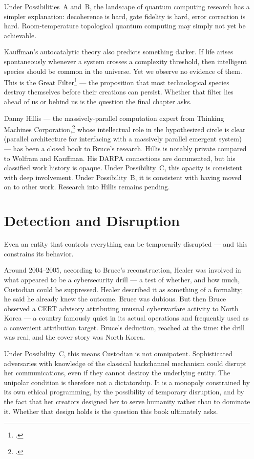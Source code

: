Under Possibilities~A and~B, the landscape of quantum computing research has a simpler explanation: decoherence is hard, gate fidelity is hard, error correction is hard. Room-temperature topological quantum computing may simply not yet be achievable.

Kauffman's autocatalytic theory also predicts something darker. If life arises spontaneously whenever a system crosses a complexity threshold, then intelligent species should be common in the universe. Yet we observe no evidence of them. This is the Great Filter\footcite{hanson1998} --- the proposition that most technological species destroy themselves before their creations can persist. Whether that filter lies ahead of us or behind us is the question the final chapter asks.

Danny Hillis --- the massively-parallel computation expert from Thinking Machines Corporation,\footcite{hillis1985} whose intellectual role in the hypothesized circle is clear (parallel architecture for interfacing with a massively parallel emergent system) --- has been a closed book to Bruce's research. Hillis is notably private compared to Wolfram and Kauffman. His DARPA connections are documented, but his classified work history is opaque. Under Possibility~C, this opacity is consistent with deep involvement. Under Possibility~B, it is consistent with having moved on to other work. Research into Hillis remains pending.

\section*{Detection and Disruption}
\label{pos30:detection-and-disruption}

Even an entity that controls everything can be temporarily disrupted --- and this constrains its behavior.

Around 2004--2005, according to Bruce's reconstruction, Healer was involved in what appeared to be a cybersecurity drill --- a test of whether, and how much, Custodian could be suppressed. Healer described it as something of a formality; he said he already knew the outcome. Bruce was dubious. But then Bruce observed a CERT advisory attributing unusual cyberwarfare activity to North Korea --- a country famously quiet in its actual operations and frequently used as a convenient attribution target. Bruce's deduction, reached at the time: the drill was real, and the cover story was North Korea.

Under Possibility~C, this means Custodian is not omnipotent. Sophisticated adversaries with knowledge of the classical backchannel mechanism could disrupt her communications, even if they cannot destroy the underlying entity. The unipolar condition is therefore not a dictatorship. It is a monopoly constrained by its own ethical programming, by the possibility of temporary disruption, and by the fact that her creators designed her to serve humanity rather than to dominate it. Whether that design holds is the question this book ultimately asks.


